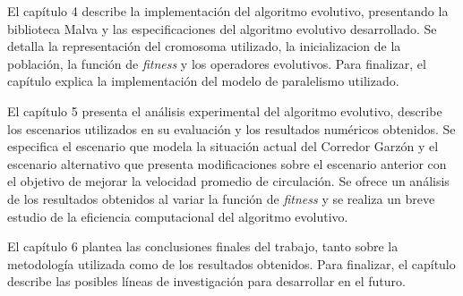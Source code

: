 El capítulo 4 describe la implementación del algoritmo evolutivo, presentando la biblioteca Malva y las especificaciones del algoritmo evolutivo desarrollado. Se detalla la representación del cromosoma utilizado, la inicializacion de la población, la función de \emph{fitness} y los operadores evolutivos. Para finalizar, el capítulo explica la implementación del modelo de paralelismo utilizado.


El capítulo 5 presenta el análisis experimental del algoritmo evolutivo, describe los escenarios utilizados en su evaluación y los resultados numéricos obtenidos. Se especifica el escenario que modela la situación actual del Corredor Garzón y el escenario alternativo que presenta modificaciones sobre el escenario anterior con el objetivo de mejorar la velocidad promedio de circulación. Se ofrece un análisis de los resultados obtenidos al variar la función de \emph{fitness} y se realiza un breve estudio de la eficiencia computacional del algoritmo evolutivo.

El capítulo 6 plantea las conclusiones finales del trabajo, tanto sobre la metodología utilizada como de los resultados obtenidos. Para finalizar, el capítulo describe las posibles líneas de investigación para desarrollar en el futuro.






